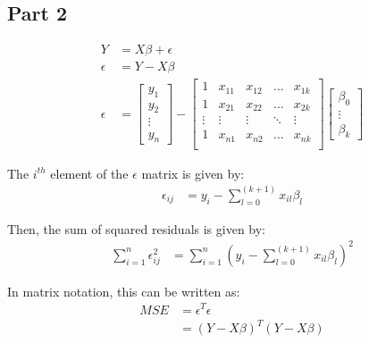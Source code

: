 \documentclass{article}[12pt]
\begin{document}
\subsection{Part 2}
\begin{align*}
    Y        & = X \beta + \epsilon                                         \\
    \epsilon & = Y - X \beta                                                \\
    \epsilon & = \begin{bmatrix}
                     y_1    \\
                     y_2    \\
                     \vdots \\
                     y_n
                 \end{bmatrix} - \begin{bmatrix}
                                     1      & x_{11} & x_{12} & \dots  & x_{1k} \\
                                     1      & x_{21} & x_{22} & \dots  & x_{2k} \\
                                     \vdots & \vdots & \vdots & \ddots & \vdots \\
                                     1      & x_{n1} & x_{n2} & \dots  & x_{nk} \\
                                 \end{bmatrix} \begin{bmatrix}
                                                   \beta_0 \\
                                                   \vdots  \\
                                                   \beta_k
                                               \end{bmatrix}
\end{align*}

The $i^{th}$ element of the $\epsilon$ matrix is given by:
\begin{align*}
    \epsilon_{ij} & = y_i - \sum_{l=0}^{(k+1)} x_{il} \beta_l
\end{align*}

Then, the sum of squared residuals is given by:
\begin{align*}
    \sum_{i=1}^{n} \epsilon_{ij}^2 & = \sum_{i=1}^{n} (y_i - \sum_{l=0}^{(k+1)} x_{il} \beta_l)^2
\end{align*}

In matrix notation, this can be written as:
\begin{align*}
    MSE & = \epsilon^T \epsilon           \\
        & = (Y - X \beta)^T (Y - X \beta)
\end{align*}
\end{document}
